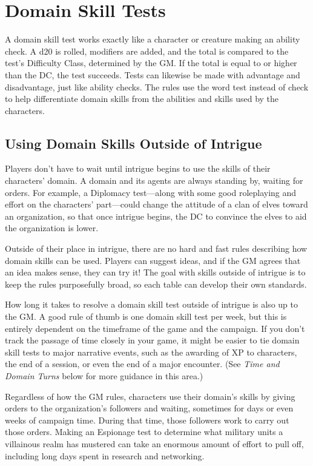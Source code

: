 \documentclass[10pt,a4paper,twoside,bg=print,twocolumn,openany,nodeprecatedcode]{dndbook}
\begin{document}
\section{Domain Skill Tests}
A domain skill test works exactly like a character or creature making an ability check. A d20 is rolled, modifiers are added, and the total is compared to the test's Difficulty Class, determined by the GM. If the total is equal to or higher than the DC, the test succeeds. Tests can likewise be made with advantage and disadvantage, just like ability checks. The rules use the word test instead of check to help differentiate domain skills from the abilities and skills used by the characters.

\subsection{Using Domain Skills Outside of Intrigue}
Players don't have to wait until intrigue begins to use the skills of their characters' domain. A domain and its agents are always standing by, waiting for orders. For example, a Diplomacy test—along with some good roleplaying and effort on the characters' part—could change the attitude of a clan of elves toward an organization, so that once intrigue begins, the DC to convince the elves to aid the organization is lower.

Outside of their place in intrigue, there are no hard and fast rules describing how domain skills can be used. Players can suggest ideas, and if the GM agrees that an idea makes sense, they can try it! The goal with skills outside of intrigue is to keep the rules purposefully broad, so each table can develop their own standards.

How long it takes to resolve a domain skill test outside of intrigue is also up to the GM. A good rule of thumb is one domain skill test per week, but this is entirely dependent on the timeframe of the game and the campaign. If you don't track the passage of time closely in your game, it might be easier to tie domain skill tests to major narrative events, such as the awarding of XP to characters, the end of a session, or even the end of a major encounter. (See \textit{Time and Domain Turns} below for more guidance in this area.)

Regardless of how the GM rules, characters use their domain's skills by giving orders to the organization's followers and waiting, sometimes for days or even weeks of campaign time. During that time, those followers work to carry out those orders. Making an Espionage test to determine what military units a villainous realm has mustered can take an enormous amount of effort to pull off, including long days spent in research and networking.
\end{document}
